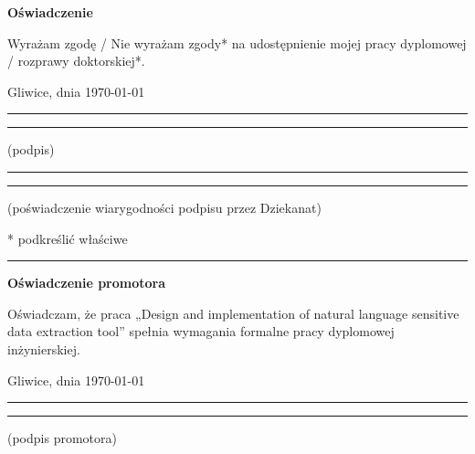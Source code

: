 \documentclass[a4paper,twoside,12pt]{book}
\newcommand{\Title}{Design and implementation of natural language sensitive data extraction tool}
\begin{document}
\begin{center}
\Large\bfseries Oświadczenie
\end{center}

\vfill

Wyrażam  zgodę / Nie wyrażam zgody*  na  udostępnienie  mojej  pracy  dyplomowej / rozprawy doktorskiej*.

\vfill

Gliwice, dnia {\today}

\vfill

\rule{0.5\textwidth}{0cm}\dotfill 

\rule{0.5\textwidth}{0cm}
\begin{minipage}{0.45\textwidth}
{\begin{center}(podpis)\end{center}}
\end{minipage} 

\vfill

\rule{0.5\textwidth}{0cm}\dotfill 

\rule{0.5\textwidth}{0cm}
\begin{minipage}{0.45\textwidth}
{\begin{center}\rule{0mm}{5mm}(poświadczenie wiarygodności podpisu przez Dziekanat)\end{center}}
\end{minipage}


\vfill

* podkreślić właściwe

 


\cleardoublepage

\rule{1cm}{0cm}

\vfill  

\begin{center}
\Large\bfseries Oświadczenie promotora
\end{center}

\vfill

Oświadczam, że praca „\Title” spełnia wymagania formalne pracy dyplomowej inżynierskiej.

\vfill



\vfill

Gliwice, dnia {\today}

\rule{0.5\textwidth}{0cm}\dotfill 

\rule{0.5\textwidth}{0cm}
\begin{minipage}{0.45\textwidth}
{\begin{center}(podpis promotora)\end{center}}
\end{minipage} 
\end{document}
